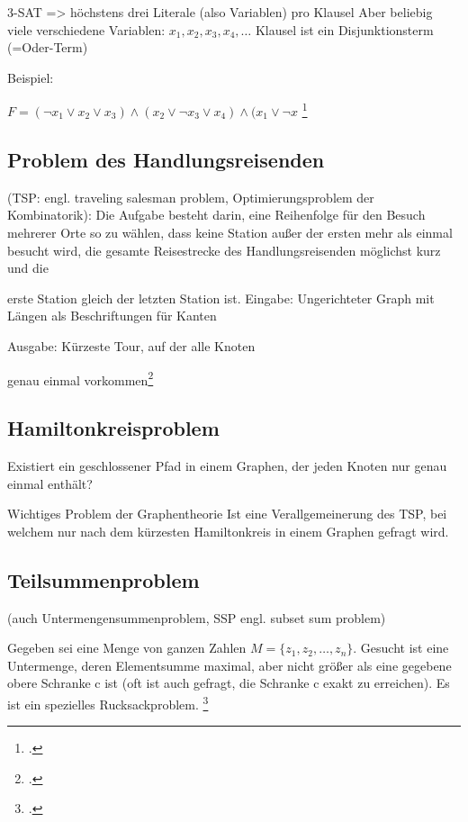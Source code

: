 \documentclass{lehramt-informatik-haupt}
\begin{document}
3-SAT => höchstens drei Literale (also Variablen) pro Klausel
Aber beliebig viele verschiedene Variablen: $x_1, x_2, x_3, x_4, \dots$
Klausel ist ein Disjunktionsterm (=Oder-Term)

Beispiel:

$F = (\neg x_1 \lor x_2 \lor x_3 ) \land (x_2 \lor \neg x_3 \lor x_4 )
\land (x_1 \lor \neg x$
\footcite[Seite 72]{theo:fs:4}
%

\subsection{Problem des Handlungsreisenden}

(TSP: engl. traveling salesman problem, Optimierungsproblem der
Kombinatorik): Die Aufgabe besteht darin, eine Reihenfolge für den
Besuch mehrerer Orte so zu wählen, dass keine Station außer der ersten
mehr als einmal besucht wird, die gesamte Reisestrecke des
Handlungsreisenden möglichst kurz und die

erste Station gleich der letzten Station ist. Eingabe: Ungerichteter
Graph mit Längen als Beschriftungen für Kanten

Ausgabe: Kürzeste Tour, auf der alle Knoten

genau einmal vorkommen\footcite[Seite 73]{theo:fs:4}

%

\subsection{Hamiltonkreisproblem}

Existiert ein geschlossener Pfad in einem Graphen, der jeden Knoten nur
genau einmal enthält?

Wichtiges Problem der Graphentheorie Ist eine Verallgemeinerung des TSP,
bei welchem nur nach dem kürzesten Hamiltonkreis in einem Graphen
gefragt wird.

%

\subsection{Teilsummenproblem}

(auch Untermengensummenproblem, SSP engl. subset sum problem)

Gegeben sei eine Menge von ganzen Zahlen $M = \{z_1 , z_2 , \dots, z_n
\}$. Gesucht ist eine Untermenge, deren Elementsumme maximal, aber nicht
größer als eine gegebene obere Schranke c ist (oft ist auch gefragt, die
Schranke c exakt zu erreichen). Es ist ein spezielles Rucksackproblem.
\footcite[Seite 74]{theo:fs:4}
\end{document}
